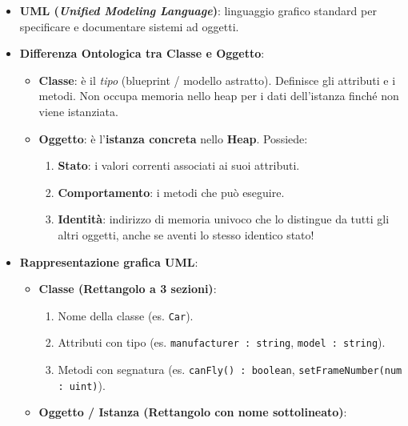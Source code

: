 \documentclass[11pt,a4paper,oneside]{report}
\newcommand{\passthrough}[1]{#1}
\providecommand{\tightlist}{\setlength{\itemsep}{0pt}\setlength{\parskip}{0pt}}
\begin{document}
\begin{itemize}
\tightlist
\item
  \textbf{UML (\emph{Unified Modeling Language})}: linguaggio grafico
  standard per specificare e documentare sistemi ad oggetti.
\item
  \textbf{Differenza Ontologica tra Classe e Oggetto}:

  \begin{itemize}
  \tightlist
  \item
    \textbf{Classe}: è il \emph{tipo} (blueprint / modello astratto).
    Definisce gli attributi e i metodi. Non occupa memoria nello heap
    per i dati dell'istanza finché non viene istanziata.
  \item
    \textbf{Oggetto}: è l'\textbf{istanza concreta} nello \textbf{Heap}.
    Possiede:

    \begin{enumerate}
    \def\labelenumi{\arabic{enumi}.}
    \tightlist
    \item
      \textbf{Stato}: i valori correnti associati ai suoi attributi.
    \item
      \textbf{Comportamento}: i metodi che può eseguire.
    \item
      \textbf{Identità}: indirizzo di memoria univoco che lo distingue
      da tutti gli altri oggetti, anche se aventi lo stesso identico
      stato!
    \end{enumerate}
  \end{itemize}
\item
  \textbf{Rappresentazione grafica UML}:

  \begin{itemize}
  \tightlist
  \item
    \textbf{Classe (Rettangolo a 3 sezioni)}:

    \begin{enumerate}
    \def\labelenumi{\arabic{enumi}.}
    \tightlist
    \item
      Nome della classe (es. \passthrough{\lstinline!Car!}).
    \item
      Attributi con tipo (es.
      \passthrough{\lstinline!manufacturer : string!},
      \passthrough{\lstinline!model : string!}).
    \item
      Metodi con segnatura (es.
      \passthrough{\lstinline!canFly() : boolean!},
      \passthrough{\lstinline!setFrameNumber(num : uint)!}).
    \end{enumerate}
  \item
    \textbf{Oggetto / Istanza (Rettangolo con nome sottolineato)}:


\end{itemize}
\end{itemize}
\end{document}
